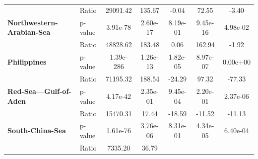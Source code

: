 \begin{table}[H]
{\begin{tabular}{llccccc}
            \textbf{}                                           & Ratio    &
            29091.42                                            & 135.67   &
            -0.04
                                                                & 72.55    &
            -3.40
            \\
            \textbf{Northwestern-Arabian-Sea}                   & p-value  &
            3.91e-78                                            & 2.60e-17 &
            8.19e-01                                            & 9.45e-16 &
            4.98e-02
            \\
            \textbf{}                                           & Ratio    &
            48828.62                                            & 183.48   &
            0.06
                                                                & 162.94   &
            -1.92
            \\
            \textbf{Philippines}                                & p-value  &
            1.39e-286                                           & 1.26e-13 &
            1.82e-05                                            & 8.97e-07 &
            0.00e+00
            \\
            \textbf{}                                           & Ratio    &
            71195.32                                            & 188.54   &
            -24.29
                                                                & 97.32    &
            -77.33
            \\
            \textbf{Red-Sea---Gulf-of-Aden}                     & p-value  &
            4.17e-42                                            & 2.35e-01 &
            9.45e-04                                            & 2.20e-01 &
            2.37e-06
            \\
            \textbf{}                                           & Ratio    &
            15470.31                                            & 17.44    &
            -18.59
                                                                & -11.52   &
            -11.13
            \\
            \textbf{South-China-Sea}                            & p-value  &
            1.61e-76                                            & 3.76e-06 &
            8.31e-01                                            & 4.34e-05 &
            6.40e-04
            \\
            \textbf{}                                           & Ratio    &
            7335.20                                             & 36.79    &

\end{tabular}}
\end{table}
